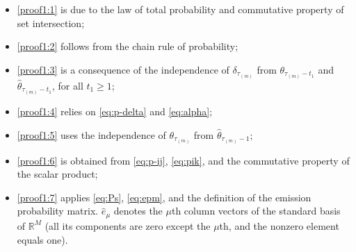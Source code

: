 \documentclass[journal,twoside,web]{ieeecolor}
\begin{document}
\begin{figure*}[ht]
\begin{itemize}
    \item \eqref{proof1:1} is due to the law of total probability and commutative property of set intersection;
    \item \eqref{proof1:2} follows from the chain rule of probability;
    \item \eqref{proof1:3} is a consequence of the independence of $\delta_{\tau_{(m)}}$ from $\theta_{\tau_{(m)}-t_{1}}$ and $\hat{\theta}_{\tau_{(m)}-t_{1}}$, for all $t_{1}\geq 1$;
    \item \eqref{proof1:4} relies on \eqref{eq:p-delta} and \eqref{eq:alpha};
    \item \eqref{proof1:5} uses the independence of $\theta_{\tau_{(m)}}$ from $\hat{\theta}_{\tau_{(m)}-1}$;
    \item \eqref{proof1:6} is obtained from \eqref{eq:p-ij}, \eqref{eq:pik}, and the commutative property of the scalar product;
    \item \eqref{proof1:7} applies \eqref{eq:Ps}, \eqref{eq:epm}, and the definition of the emission probability matrix. $\hat{e}_{\mu}$ denotes the $\mu$th column vectors of the standard basis of $\mathbb{R}^{M}$ (all its components are zero except the $\mu$th, and the nonzero element equals one).
\end{itemize}
\end{figure*}
\end{document}
